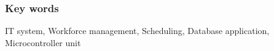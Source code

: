 \subsubsection*{Key words}
\begin{otherlanguage}{british}
    IT system, Workforce management, Scheduling, Database application, \newline Microcontroller unit
\end{otherlanguage}

